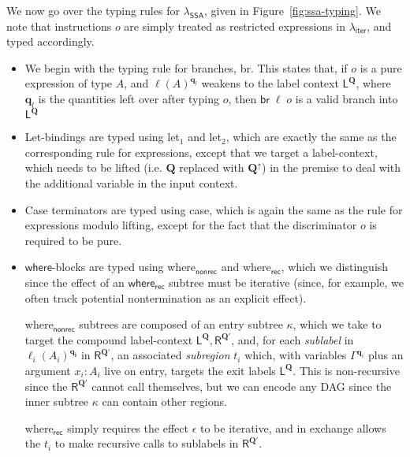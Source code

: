 \documentclass[acmsmall,screen,review]{acmart}
\newcommand{\mb}[1]{\ensuremath{\mathbf{#1}}}
\newcommand{\ms}[1]{\ensuremath{\mathsf{#1}}}
\newcommand{\brb}[2]{\ms{br}\;#1\;#2}
\newcommand{\brle}[1]{{\textsf{#1}}}
\newcommand{\subiterexp}{\texorpdfstring{\(\lambda_{\ms{iter}}\)}{lambda-iter}}
\newcommand{\isotopessa}{\(\lambda_{\ms{SSA}}\)}
\newcommand{\zeroqv}[1]{#1^\uparrow}
\begin{document}
We now go over the typing rules for \isotopessa{}, given in Figure~\ref{fig:ssa-typing}. We note
that instructions $o$ are simply treated as restricted expressions in \subiterexp{}, and typed 
accordingly.
\begin{itemize}
  \item We begin with the typing rule for branches, \brle{br}. This states that, if $o$ is a pure
  expression of type $A$, and $\ell(A)^{\mb{q}_l}$ weakens to the label context 
  $\ms{L}^{\mb{Q}}$, where $\mb{q}_l$ is the quantities left over after typing $o$, then
  $\brb{\ell}{o}$ is a valid branch into $\ms{L}^{\mb{Q}}$
  \item Let-bindings are typed using \brle{let$_1$} and \brle{let$_2$}, which are exactly the same
  as the corresponding rule for expressions, except that we target a label-context, which needs to
  be lifted (i.e. $\mb{Q}$ replaced with $\zeroqv{\mb{Q}}$) in the premise to deal with the 
  additional variable in the input context.
  \item Case terminators are typed using \brle{case}, which is again the same as the rule for 
  expressions modulo lifting, except for the fact that the discriminator $o$ is required to be
  pure.
  \item \ms{where}-blocks are typed using \brle{where$_\ms{nonrec}$} and \brle{where$_\ms{rec}$}, 
  which we distinguish since the effect of an \ms{where_{rec}} subtree must be iterative 
  (since, for example, we often track potential nontermination as an explicit effect).

  \brle{where$_\ms{nonrec}$} subtrees are composed of an entry subtree $\kappa$, which we take to target
  the compound label-context $\ms{L}^{\mb{Q}}, \ms{R}^{\mb{Q}'}$, and,
  for each \emph{sublabel} in $\ell_i(A_i)^{\mb{q_i}}$ in $\ms{R}^{\mb{Q}'}$, an 
  associated \emph{subregion} $t_i$ which, with variables $\Gamma^{\mb{q}_i}$ plus an argument 
  $x_i : A_i$ live on entry, targets the exit labels $\ms{L}^{\mb{Q}}$. 
  This is non-recursive since the $\ms{R}^{\mb{Q}'}$ cannot call themselves, but we can 
  encode any DAG since the inner subtree $\kappa$ can contain other regions.

  \brle{where$_\ms{rec}$} simply requires the effect $\epsilon$ to be iterative, and in exchange 
  allows the $t_i$ to make recursive calls to sublabels in $\ms{R}^{\mb{Q}'}$.
\end{itemize}
\end{document}
